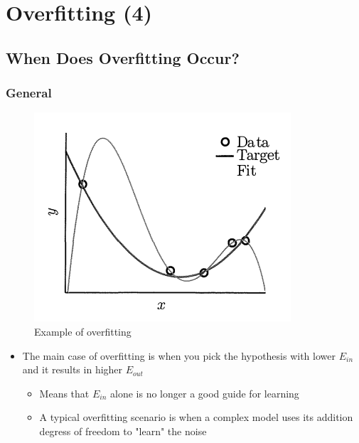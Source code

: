 \documentclass[11pt]{article}
\begin{document}
\section{Overfitting (4)}
\label{sec:org7d23c93}
\subsection{When Does Overfitting Occur?}
\label{sec:orgb8bac2a}
\subsubsection{General}
\label{sec:org9e09ea0}
\begin{figure}[htbp]
\centering
\includegraphics[width=.9\linewidth]{Overfitting (4)/screenshot_2018-09-17_10-02-37.png}
\caption{\label{fig:org49557a1}
Example of overfitting}
\end{figure}
\begin{itemize}
\item The main case of overfitting is when you pick the hypothesis with lower \(E_{in}\) and it results in higher \(E_{out}\)
\begin{itemize}
\item Means that \(E_{in}\) alone is no longer a good guide for learning
\item A typical overfitting scenario is when a complex model uses its addition degress of freedom to "learn" the noise
\end{itemize}
\end{itemize}
\end{document}
